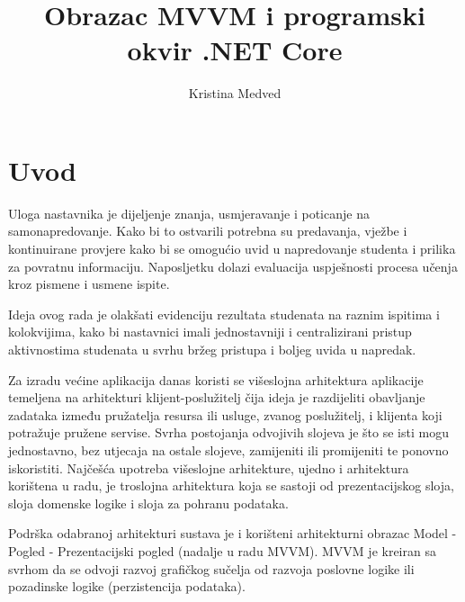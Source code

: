 \documentclass[times, utf8, diplomski]{fer}
\begin{document}

\title{Obrazac MVVM i programski okvir .NET Core}

\author{Kristina Medved}

\maketitle




\zahvala{}

\tableofcontents

\chapter{Uvod}
Uloga nastavnika je dijeljenje znanja, usmjeravanje i poticanje na samonapredovanje. Kako bi to ostvarili potrebna su predavanja, vježbe i kontinuirane provjere kako bi se omogućio uvid u napredovanje studenta i prilika za povratnu informaciju. Naposljetku dolazi evaluacija uspješnosti procesa učenja kroz pismene i usmene ispite. 

Ideja ovog rada je olakšati evidenciju rezultata studenata na raznim ispitima i kolokvijima, kako bi nastavnici imali jednostavniji i centralizirani pristup aktivnostima studenata u svrhu bržeg pristupa i boljeg uvida u napredak. 

Za izradu većine aplikacija danas koristi se višeslojna arhitektura aplikacije temeljena na arhitekturi klijent-poslužitelj čija ideja je razdijeliti obavljanje zadataka između pružatelja resursa ili usluge, zvanog poslužitelj, i klijenta koji potražuje pružene servise. Svrha postojanja odvojivih slojeva je što se isti mogu jednostavno, bez utjecaja na ostale slojeve, zamijeniti ili promijeniti te ponovno iskoristiti. Najčešća upotreba višeslojne arhitekture, ujedno i arhitektura korištena u radu, je troslojna arhitektura koja se sastoji od prezentacijskog sloja, sloja domenske logike i sloja za pohranu podataka.

Podrška odabranoj arhitekturi sustava je i korišteni arhitekturni obrazac Model - Pogled - Prezentacijski pogled  (nadalje u radu MVVM). MVVM je kreiran sa svrhom da se odvoji razvoj grafičkog sučelja od razvoja poslovne logike ili pozadinske logike (perzistencija podataka). 
\end{document}
